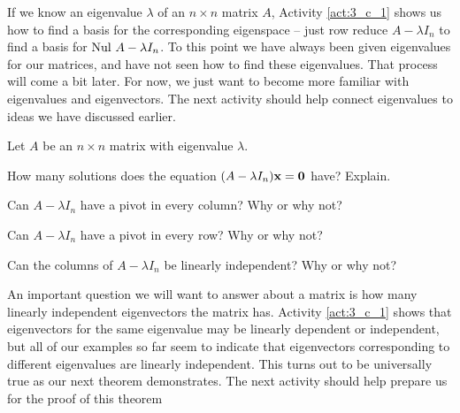 If we know an eigenvalue $\lambda$ of an $n \times n$ matrix $A$, Activity \ref{act:3_c_1} shows us how to find a basis for the corresponding eigenspace -- just row reduce $A - \lambda I_n$ to find a basis for $\text{Nul } A-\lambda I_n$. To this point we have always been given eigenvalues for our matrices, and have not seen how to find these eigenvalues. That process will come a bit later. For now, we just want to become more familiar with eigenvalues and eigenvectors. The next activity should help connect eigenvalues to ideas we have discussed earlier. 



\begin{activity} \label{act:3_c_2} Let $A$ be an $n \times n$ matrix with eigenvalue $\lambda$. 
\ba
\item How many solutions does the equation $(A-\lambda I_n) \mathbf{x} = \mathbf{0}$ have? Explain.



\item Can $A - \lambda I_n$ have a pivot in every column? Why or why not?



\item Can $A - \lambda I_n$ have a pivot in every row? Why or why not?



\item Can the columns of $A - \lambda I_n$ be linearly independent? Why or why not?



\ea

\end{activity}
 


An important question we will want to answer about a matrix is how many linearly independent eigenvectors the matrix has. Activity \ref{act:3_c_1} shows that eigenvectors for the same eigenvalue may be linearly dependent or independent, but all of our examples so far seem to indicate that eigenvectors corresponding to different eigenvalues are linearly independent. This turns out to be universally true as our next theorem demonstrates. The next activity should help prepare us for the proof of this theorem



